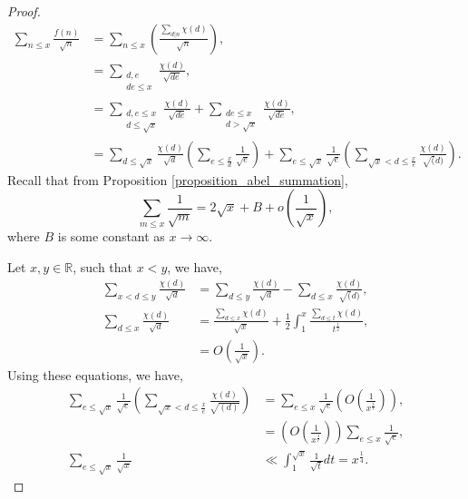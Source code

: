 \documentclass{article}
\newcommand{\R}[0]{\mathbb{R}}
\begin{document}
  \begin{proof}
    \begin{align*}
      \sum_{n\leq x}{\frac {f(n)} {\sqrt{n}}} & = \sum_{n\leq x}\left({\frac{\sum_{d|n}\chi(d)}{\sqrt{n}}}\right),\\
      & = \sum_{\substack{d,e\\ de\leq x}}{\frac {\chi(d)} {\sqrt{de}}},\\
      & = \sum_{\substack{d,e\leq x\\ d\leq \sqrt{x}}}{\frac {\chi(d)} {\sqrt{de}}} +\sum_{\substack{de\leq x\\d>\sqrt{x}}}{\frac {\chi(d)} {\sqrt{de}}},\\
      & = \sum_{d\leq \sqrt{x}}{\frac {\chi(d)} {\sqrt{d}}}\left(\sum_{e\leq {\frac x d}}{\frac 1 {\sqrt{e}}}\right)+\sum_{e\leq\sqrt{x}}{\frac 1 {\sqrt{e}}}\left(\sum_{\sqrt{x}<d\leq {\frac x e}}{\frac {\chi(d)} {\sqrt(d)}}\right).
    \end{align*}
    Recall that from Proposition \ref{proposition_abel_summation},
    \begin{equation*}
      \sum_{m\leq x}{\frac 1 {\sqrt{m}}} = 2\sqrt{x}+B+o\left({\frac 1 {\sqrt{x}}}\right),
    \end{equation*}
    where $B$ is some constant as $x\to \infty$.
    \par Let $x,y\in\R$, such that $x<y$, we have,
    \begin{align*}
      \sum_{x<d\leq y}{\frac {\chi(d)} {\sqrt{d}}}&= \sum_{d\leq y}{\frac {\chi(d)} {\sqrt{d}}}-\sum_{d\leq x}{\frac {\chi(d)} {\sqrt(d)}},\\
      \sum_{d\leq x}{\frac {\chi(d)} {\sqrt{d}}} & = {\frac {\sum_{d\leq x} \chi(d)} {\sqrt{x}}}+{\frac 1 2}\int_1^x {\frac {\sum_{d\leq t}\chi(d)} {t^{{\frac 1 2}}}},\\
      & = O\left({\frac {1} {\sqrt{x}}}\right). 
    \end{align*}
    Using these equations, we have,
    \begin{align*}
      \sum_{e\leq\sqrt{x}}{\frac 1 {\sqrt{e}}}\left(\sum_{\sqrt{x}<d\leq {\frac x e}}{\frac {\chi(d)} {\sqrt{(d)}}}\right) & = \sum_{e\leq x}{\frac 1 {\sqrt{e}}}\left(O\left({\frac 1 {x^{{\frac 1 r}}}}\right)\right),\\
      & = \left(O\left({\frac 1 {x^{{\frac 1 r}}}}\right)\right)\sum_{e\leq x}{\frac 1 {\sqrt{e}}},\\
      \sum_{e\leq \sqrt{x}}{\frac 1 {\sqrt{x}}}&\ll  \int_1^{\sqrt{x}}{\frac 1 {\sqrt{t}}}dt = x^{{\frac 1 4}}.

\end{align*}
\end{proof}
\end{document}
